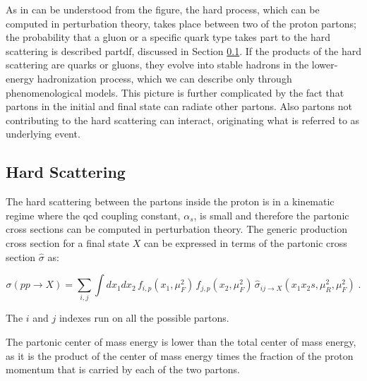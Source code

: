 As in can be understood from the figure, the hard process, which can be computed in perturbation theory, takes place between two of the proton partons; the probability that a gluon or a specific quark type takes part to the hard scattering is described \gls{partdf}, discussed in Section \ref{sec:ppint:hardscatter}. If the products of the hard scattering are quarks or gluons, they evolve into stable hadrons in the lower-energy hadronization process, which we can describe only through phenomenological models.
This picture is further complicated by the fact that partons in the initial and final state can radiate other partons.
Also partons not contributing to the hard scattering can interact, originating what is referred to as underlying event. 

\subsection{Hard Scattering}
\label{sec:ppint:hardscatter}

The hard scattering between the partons inside the proton is in a kinematic regime where the \gls{qcd} coupling constant, $\alpha_s$, 
is small and therefore the partonic cross sections can be computed in perturbation theory. 
The generic production cross section for a final state $X$ can be expressed in terms of the partonic cross section $\hat\sigma$ as:

\begin{equation}
  \label{eq:general-cross-section}
  \sigma(pp\rightarrow X) = \sum_{i,j} \int dx_1 dx_2\, 
     f_{i,p}(x_1,\mu_F^2)\, f_{j,p}(x_2,\mu_F^2)\, 
     \hat\sigma_{ij\rightarrow X}(x_1 x_2 s, \mu_R^2, \mu_F^2) \; .
\end{equation}

The $i$ and $j$ indexes run on all the possible partons.  

The partonic center of mass energy \cmpart is lower than the total center of mass energy, as it is the product of the center of mass energy times
the fraction of the proton momentum that is carried by each of the two partons. 


\cite{doi:10.1146}

